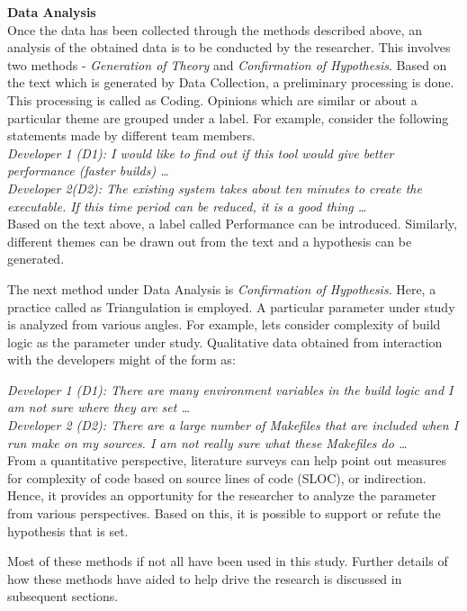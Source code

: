 \documentclass[12pt, a4paper, titlepage]{scrartcl}
\newcommand{\courierword}[1]{\textsf{\itshape #1}}{\fontfamily{pcr}\selectfont}%
\begin{document}
\textbf{Data Analysis} \\
Once the data has been collected through the methods described above, an analysis of the obtained data is to be conducted by the researcher. This involves two methods - \textit{Generation of Theory} and \textit{Confirmation of Hypothesis}. Based on the text which is generated by Data Collection, a preliminary processing is done. This processing is called as Coding\cite{wagner2016analysing}. Opinions which are similar or about a particular theme are grouped under a label. For example, consider the following statements made by different team members.\\

\textit{Developer 1 (D1): I would like to find out if this tool would give better performance (faster builds) \ldots \\
Developer 2(D2): The existing system takes about ten minutes to create the executable. If this time period can be reduced, it is a good thing \ldots} \\

Based on the text above, a label called Performance can be introduced. Similarly, different themes can be drawn out from the text and a hypothesis can be generated. 
\par The next method under Data Analysis is \textit{Confirmation of Hypothesis}. Here, a practice called as Triangulation\cite{seaman2009using} is employed. A particular parameter under study is analyzed from various angles. For example, lets consider complexity of build logic as the parameter under study. Qualitative data obtained from interaction with the developers might of the form as: 

\textit{Developer 1 (D1): There are many environment variables in the build logic and I am not sure where they are set \ldots \\
Developer 2 (D2): There are a large number of Makefiles that are included when I run \courierword{make} on my sources. I am not really sure what these Makefiles do \ldots } \\

From a quantitative perspective, literature surveys can help point out measures for complexity of code based on source lines of code (SLOC), or indirection. Hence, it provides an opportunity for the researcher to analyze the parameter from various perspectives. Based on this, it is possible to support or refute the hypothesis that is set. 

\par Most of these methods if not all have been used in this study. Further details of how these methods have aided to help drive the research is discussed in subsequent sections.  
\end{document}
